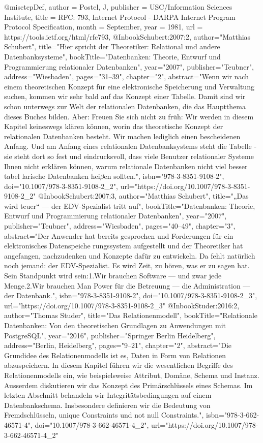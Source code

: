 @misc{tcpDef,
author = {Postel, J},
publisher = {USC/Information Sciences Institute},
title = {RFC: 793, Internet Protocol - DARPA Internet Program Protocol Specification},
month = {September},
year = {1981},
url = {https://tools.ietf.org/html/rfc793},
}
@Inbook{Schubert:2007:2,
author="Matthias Schubert",
title="Hier spricht der Theoretiker: Relational und andere Datenbanksysteme",
bookTitle="Datenbanken: Theorie, Entwurf und Programmierung relationaler Datenbanken",
year="2007",
publisher="Teubner",
address="Wiesbaden",
pages="31--39",
chapter="2",
abstract="Wenn wir nach einem theoretischen Konzept f{\"u}r eine elektronische Speicherung und Verwaltung suchen, kommen wir sehr bald auf das Konzept einer Tabelle. Damit sind wir schon unterwegs zur Welt der relationalen Datenbanken, die das Hauptthema dieses Buches bilden. Aber: Freuen Sie sich nicht zu fr{\"u}h: Wir werden in diesem Kapitel keineswegs kl{\"a}ren k{\"o}nnen, worin das theoretische Konzept der relationalen Datenbanken besteht. Wir machen lediglich einen bescheidenen Anfang. Und am Anfang eines relationalen Datenbanksystems steht die Tabelle - sie steht dort so fest und eindrucksvoll, dass viele Benutzer relationaler Systeme Ihnen nicht erkl{\"a}ren k{\"o}nnen, warum relationale Datenbanken nicht viel besser tabel larische Datenbanken hei$\beta$en sollten.",
isbn="978-3-8351-9108-2",
doi="10.1007/978-3-8351-9108-2_2",
url="https://doi.org/10.1007/978-3-8351-9108-2\_2"
}
@Inbook{Schubert:2007:3,
author="Matthias Schubert",
title="„Das wird teuer`` --- der EDV-Spezialist tritt auf",
bookTitle="Datenbanken: Theorie, Entwurf und Programmierung relationaler Datenbanken",
year="2007",
publisher="Teubner",
address="Wiesbaden",
pages="40--49",
chapter="3",
abstract="Der Anwender hat bereits gesprochen und Forderungen f{\"u}r ein elektronisches Datenspeiche rungssystem aufgestellt und der Theoretiker hat angefangen, nachzudenken und Konzepte daf{\"u}r zu entwickeln. Da fehlt nat{\"u}rlich noch jemand: der EDV-Spezialist. Es wird Zeit, zu h{\"o}ren, was er zu sagen hat. Sein Standpunkt wird sein:1.Wir brauchen Software --- und zwar jede Menge.2.Wir brauchen Man Power f{\"u}r die Betreuung --- die Administration --- der Datenbank.",
isbn="978-3-8351-9108-2",
doi="10.1007/978-3-8351-9108-2_3",
url="https://doi.org/10.1007/978-3-8351-9108-2\_3"
}
@Inbook{Studer:2016:2,
author="Thomas Studer",
title="Das Relationenmodell",
bookTitle="Relationale Datenbanken: Von den theoretischen Grundlagen zu Anwendungen mit PostgreSQL",
year="2016",
publisher="Springer Berlin Heidelberg",
address="Berlin, Heidelberg",
pages="9--21",
chapter="2",
abstract="Die Grundidee des Relationenmodells ist es, Daten in Form von Relationen abzuspeichern. In diesem Kapitel f{\"u}hren wir die wesentlichen Begriffe des Relationenmodells ein, wie beispielsweise Attribut, Dom{\"a}ne, Schema und Instanz. Ausserdem diskutieren wir das Konzept des Prim{\"a}rschl{\"u}ssels eines Schemas. Im letzten Abschnitt behandeln wir Integrit{\"a}tsbedingungen auf einem Datenbankschema. Insbesondere definieren wir die Bedeutung von Fremdschl{\"u}sseln, unique Constraints und not null Constraints.",
isbn="978-3-662-46571-4",
doi="10.1007/978-3-662-46571-4_2",
url="https://doi.org/10.1007/978-3-662-46571-4\_2"
}
